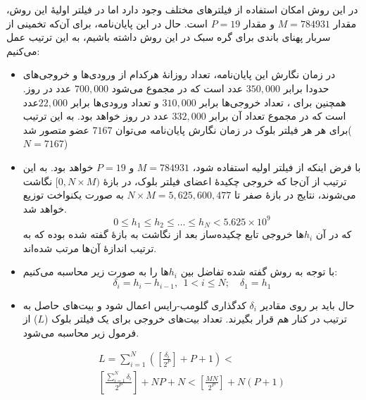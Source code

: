  در این روش امکان استفاده از فیلتر‌های مختلف وجود دارد اما در فیلتر اولیهٔ این روش، مقدار $M=784931$ و مقدار $P=19$ است. حال در این پایان‌نامه، برای آن‌که تخمینی از سربار پهنای باندی برای گره سبک در این روش داشته باشیم، به این ترتیب عمل می‌کنیم:
 \begin{itemize}
 	\item {%
 در زمان نگارش این پایان‌نامه، تعداد روزانهٔ هرکدام از ورودی‌ها و خروجی‌های  حدودا برابر $350,000$ عدد است که در مجموع می‌شود $700,000$ عدد در روز. همچنین برای ، تعداد خروجی‌ها برابر $310,000$ و تعداد ورودی‌ها برابر $22,000$عدد است
 که در مجموع تعداد آن برابر $332,000$ عدد در روز خواهد بود.
به این ترتیب برای هر هر فیلتر بلوک در زمان نگارش پایان‌نامه می‌توان $7167$ عضو متصور شد($N=7167$)
}
\item{%
با فرض اینکه از فیلتر اولیه استفاده شود، $M=784931$ و $P=19$ خواهد بود. به این ترتیب از آن‌‌جا که خروجی چکیدهٔ اعضای فیلتر بلوک، در بازهٔ 
$[0, N\times M)$
نگاشت می‌شوند، نتایج در بازهٔ صفر تا 
$N\times M = 5,625,600,477$
به صورت یکنواخت توزیع خواهد شد.\\
\begin{equation}
\label{eq:Items_in_block_filter}
0\le h_1 \leq h_2 \leq \dots \leq h_N < 5.625 \times 10^{9}
\end{equation}
که در آن $h_i$ها خروجی تابع چکیده‌ساز بعد از نگاشت به بازهٔ گفته شده بوده که به ترتیب اندازهٔ آن‌ها مرتب شده‌اند.
}
\item{%
با توجه به روش گفته شده تفاضل بین $h_i$ها را به صورت زیر محاسبه می‌کنیم:
\begin{equation}
\label{eq:delta_value_in_block_filter}
\delta_i = h_i - h_{i-1}, \ \  1<i\leq N; \quad \delta_1 = h_1
\end{equation}
}
\item{%
حال باید بر روی مقادیر $ \delta_i $ کدگذاری گلومب-رایس اعمال شود و بیت‌های حاصل به ترتیب در کنار هم قرار بگیرند. تعداد بیت‌های خروجی برای یک فیلتر بلوک ($L$) از فرمول زیر محاسبه می‌شود.



\begin{multline}
\label{eq:size_in_block_filter}
L = \sum_{i=1}^{N} \left(\left[\frac{\delta_i}{2^P}\right] + P + 1\right) < \\
\left[\frac{\sum_{i=1}^{N} \delta_i }{2^P}\right] + NP + N  <
\left[\frac{ MN }{2^P}\right] + N(P + 1) 
\end{multline}

}
\end{itemize}
